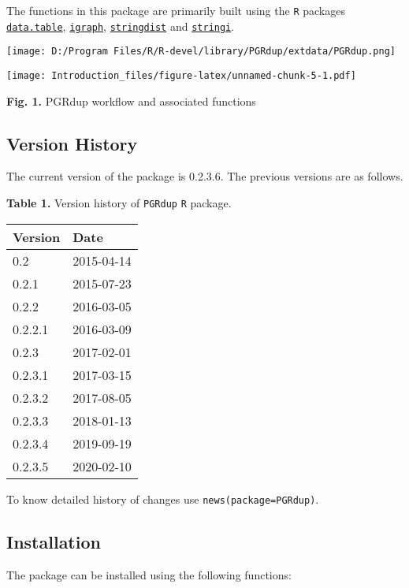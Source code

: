 \documentclass[
]{article}
\begin{document}
The functions in this package are primarily built using the \texttt{R}
packages
\href{https://CRAN.R-project.org/package=data.table}{\texttt{data.table}},
\href{https://CRAN.R-project.org/package=igraph}{\texttt{igraph}},
\href{https://CRAN.R-project.org/package=stringdist}{\texttt{stringdist}}
and \href{https://CRAN.R-project.org/package=stringi}{\texttt{stringi}}.

\clearpage
\pagebreak

\begin{center}
    \texttt{[image: D:/Program Files/R/R-devel/library/PGRdup/extdata/PGRdup.png]}
\end{center}

\texttt{[image: Introduction\_files/figure-latex/unnamed-chunk-5-1.pdf]}

\textbf{Fig. 1.} PGRdup workflow and associated functions

\hypertarget{version-history}{%
\subsection{Version History}\label{version-history}}

The current version of the package is 0.2.3.6. The previous versions are
as follows.

\textbf{Table 1.} Version history of \texttt{PGRdup} \texttt{R} package.

\begin{longtable}[]{@{}ll@{}}
\toprule
Version & Date\tabularnewline
\midrule
\endhead
0.2 & 2015-04-14\tabularnewline
0.2.1 & 2015-07-23\tabularnewline
0.2.2 & 2016-03-05\tabularnewline
0.2.2.1 & 2016-03-09\tabularnewline
0.2.3 & 2017-02-01\tabularnewline
0.2.3.1 & 2017-03-15\tabularnewline
0.2.3.2 & 2017-08-05\tabularnewline
0.2.3.3 & 2018-01-13\tabularnewline
0.2.3.4 & 2019-09-19\tabularnewline
0.2.3.5 & 2020-02-10\tabularnewline
\bottomrule
\end{longtable}

To know detailed history of changes use
\texttt{news(package=\textquotesingle{}PGRdup\textquotesingle{})}.

\pagebreak

\hypertarget{installation}{%
\subsection{Installation}\label{installation}}

The package can be installed using the following functions:
\end{document}
